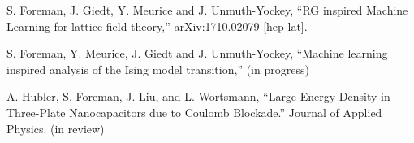 

\begin{cvparagraph}

    \vspace{2.5ex}
    \begin{cvitems}
    \item {S. Foreman, J. Giedt, Y. Meurice and J. Unmuth-Yockey, ``RG inspired
           Machine Learning for lattice field theory,''
           \href{https://arxiv.org/abs/1710.02079}{arXiv:1710.02079 [hep-lat]}.}
    \item {S. Foreman, Y. Meurice, J. Giedt and J. Unmuth-Yockey, ``Machine
           learning inspired analysis of the Ising model transition,'' (in
           progress)}
    \item {A. Hubler, S. Foreman, J. Liu, and L. Wortsmann, ``Large Energy
           Density in Three-Plate Nanocapacitors due to Coulomb Blockade.''
           Journal of Applied Physics. (in review)}
   \end{cvitems}
\end{cvparagraph}


